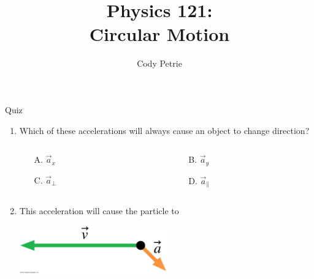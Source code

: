 \documentclass{beamer}
\title[{\color{white}{Chapters 4.4-6}}]{Physics 121: \\ Circular Motion}
\author{Cody Petrie}
\institute{Mesa Community College}
\date{}
\begin{document}
\begin{frame}
\titlepage
\end{frame}



\begin{frame}{Quiz}
\begin{enumerate}
   \item Which of these accelerations will always cause an object to change direction?
   \begin{columns}
      \begin{column}{0.5\textwidth}
      \begin{enumerate}
         \item[A.] $\vec{a}_x$
         \item[C.] $\vec{a}_\perp$
      \end{enumerate}
      \end{column}
      \begin{column}{0.5\textwidth}
      \begin{enumerate}
         \item[B.] $\vec{a}_y$
         \item[D.] $\vec{a}_\parallel$
      \end{enumerate}
      \end{column}
   \end{columns}
   \item This acceleration will cause the particle to
   \begin{center}
     \includegraphics[width=0.5\textwidth]{../figures/Figure_STT4_2.jpg}
   \end{center}
   \begin{columns}
   \begin{column}{0.5\textwidth}
   \begin{enumerate}

\end{enumerate}
\end{column}
\end{columns}
\end{enumerate}
\end{frame}
\end{document}

